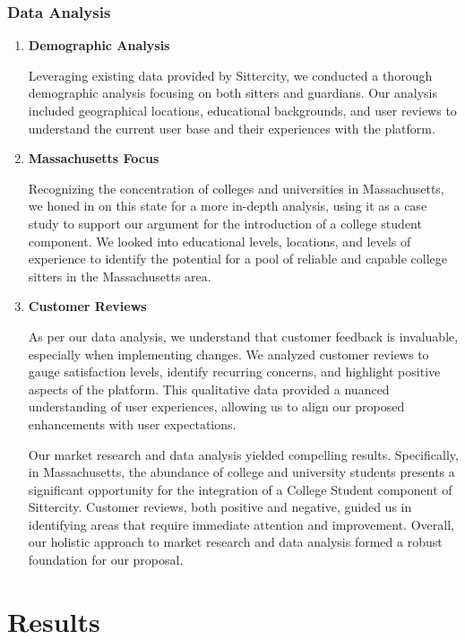 \documentclass[12pt]{article}
\begin{document}
\hypertarget{data-analysis}{%
\subsubsection{Data Analysis}\label{data-analysis}}

\begin{enumerate}
\def\labelenumi{\arabic{enumi}.}
\item
  \textbf{Demographic Analysis}

  Leveraging existing data provided by Sittercity, we conducted a
  thorough demographic analysis focusing on both sitters and guardians.
  Our analysis included geographical locations, educational backgrounds,
  and user reviews to understand the current user base and their
  experiences with the platform.
\item
  \textbf{Massachusetts Focus}

  Recognizing the concentration of colleges and universities in
  Massachusetts, we honed in on this state for a more in-depth analysis,
  using it as a case study to support our argument for the introduction
  of a college student component. We looked into educational levels,
  locations, and levels of experience to identify the potential for a
  pool of reliable and capable college sitters in the Massachusetts
  area.
\item
  \textbf{Customer Reviews}

  As per our data analysis, we understand that customer feedback is
  invaluable, especially when implementing changes. We analyzed customer
  reviews to gauge satisfaction levels, identify recurring concerns, and
  highlight positive aspects of the platform. This qualitative data
  provided a nuanced understanding of user experiences, allowing us to
  align our proposed enhancements with user expectations.

  Our market research and data analysis yielded compelling results.
  Specifically, in Massachusetts, the abundance of college and
  university students presents a significant opportunity for the
  integration of a College Student component of Sittercity. Customer
  reviews, both positive and negative, guided us in identifying areas
  that require immediate attention and improvement. Overall, our
  holistic approach to market research and data analysis formed a robust
  foundation for our proposal.
\end{enumerate}

\hypertarget{results}{%
\section{\texorpdfstring{\textbf{Results}}{Results}}\label{results}}
\end{document}
